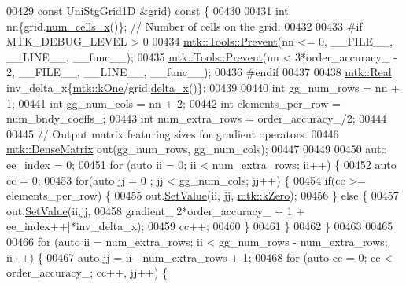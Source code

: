 \begin{DoxyCode}
{{00429   \textcolor{keyword}{const} \hyperlink{classmtk_1_1UniStgGrid1D}{UniStgGrid1D} &grid)\textcolor{keyword}{ const }\{
00430 
00431   \textcolor{keywordtype}{int} nn\{grid.\hyperlink{classmtk_1_1UniStgGrid1D_af1b3729d8afa07be5b2775ed68015b80}{num\_cells\_x}()\}; \textcolor{comment}{// Number of cells on the grid.}
00432 
00433 \textcolor{preprocessor}{  #if MTK\_DEBUG\_LEVEL > 0}
00434   \hyperlink{classmtk_1_1Tools_a332324c6f25e66be9dff48c5987a3b9f}{mtk::Tools::Prevent}(nn <= 0, \_\_FILE\_\_, \_\_LINE\_\_, \_\_func\_\_);
00435   \hyperlink{classmtk_1_1Tools_a332324c6f25e66be9dff48c5987a3b9f}{mtk::Tools::Prevent}(nn < 3*order\_accuracy\_ - 2, \_\_FILE\_\_, \_\_LINE\_\_, \_\_func\_\_);
00436 \textcolor{preprocessor}{  #endif}
00437 
00438   \hyperlink{group__c01-roots_gac080bbbf5cbb5502c9f00405f894857d}{mtk::Real} inv\_delta\_x\{\hyperlink{group__c01-roots_ga26407c24d43b6b95480943340d285c71}{mtk::kOne}/grid.\hyperlink{classmtk_1_1UniStgGrid1D_a6e7173b01241632cf509496d66b9f74c}{delta\_x}()\};
00439 
00440   \textcolor{keywordtype}{int} gg\_num\_rows = nn + 1;
00441   \textcolor{keywordtype}{int} gg\_num\_cols = nn + 2;
00442   \textcolor{keywordtype}{int} elements\_per\_row = num\_bndy\_coeffs\_;
00443   \textcolor{keywordtype}{int} num\_extra\_rows = order\_accuracy\_/2;
00444 
00445   \textcolor{comment}{// Output matrix featuring sizes for gradient operators.}
00446   \hyperlink{classmtk_1_1DenseMatrix}{mtk::DenseMatrix} out(gg\_num\_rows, gg\_num\_cols);
00447 
00449 
00450   \textcolor{keyword}{auto} ee\_index = 0;
00451   \textcolor{keywordflow}{for} (\textcolor{keyword}{auto} ii = 0; ii < num\_extra\_rows; ii++) \{
00452     \textcolor{keyword}{auto} cc = 0;
00453     \textcolor{keywordflow}{for}(\textcolor{keyword}{auto} jj = 0 ; jj < gg\_num\_cols; jj++) \{
00454       \textcolor{keywordflow}{if}(cc >= elements\_per\_row) \{
00455         out.\hyperlink{classmtk_1_1DenseMatrix_a784ce5784109ac86bfb9d8562b334b13}{SetValue}(ii, jj, \hyperlink{group__c01-roots_ga59a451a5fae30d59649bcda274fea271}{mtk::kZero});
00456       \} \textcolor{keywordflow}{else} \{
00457         out.\hyperlink{classmtk_1_1DenseMatrix_a784ce5784109ac86bfb9d8562b334b13}{SetValue}(ii,jj,
00458                      gradient\_[2*order\_accuracy\_ + 1 + ee\_index++]*inv\_delta\_x);
00459         cc++;
00460       \}
00461     \}
00462   \}
00463 
00465 
00466   \textcolor{keywordflow}{for} (\textcolor{keyword}{auto} ii = num\_extra\_rows; ii < gg\_num\_rows - num\_extra\_rows; ii++) \{
00467     \textcolor{keyword}{auto} jj = ii - num\_extra\_rows + 1;
00468     \textcolor{keywordflow}{for} (\textcolor{keyword}{auto} cc = 0; cc < order\_accuracy\_; cc++, jj++) \{
}}
\end{DoxyCode}
